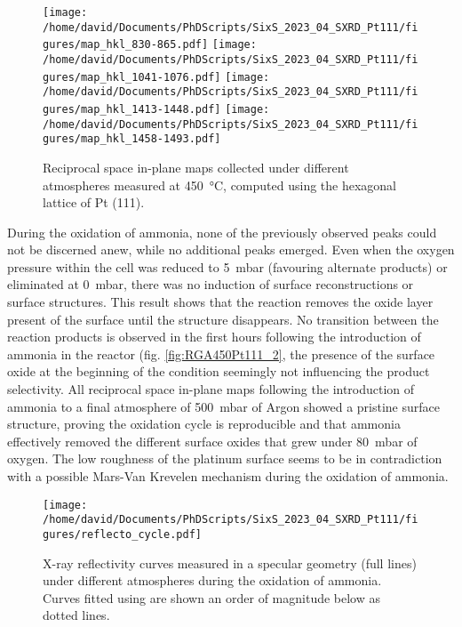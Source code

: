 \begin{figure}[!htb]
    \centering
    \texttt{[image: /home/david/Documents/PhDScripts/SixS\_2023\_04\_SXRD\_Pt111/figures/map\_hkl\_830-865.pdf]}
    \texttt{[image: /home/david/Documents/PhDScripts/SixS\_2023\_04\_SXRD\_Pt111/figures/map\_hkl\_1041-1076.pdf]}
    \texttt{[image: /home/david/Documents/PhDScripts/SixS\_2023\_04\_SXRD\_Pt111/figures/map\_hkl\_1413-1448.pdf]}
    \texttt{[image: /home/david/Documents/PhDScripts/SixS\_2023\_04\_SXRD\_Pt111/figures/map\_hkl\_1458-1493.pdf]}
    \caption{
        Reciprocal space in-plane maps collected under different atmospheres measured at \qty{450}{\degreeCelsius}, computed using the hexagonal lattice of Pt (111).
    }
    \label{fig:MapsPt111B}
\end{figure}

During the oxidation of ammonia, none of the previously observed peaks could not be discerned anew, while no additional peaks emerged.
Even when the oxygen pressure within the cell was reduced to \qty{5}{\milli\bar} (favouring alternate products) or eliminated at \qty{0}{\milli\bar}, there was no induction of surface reconstructions or surface structures.
This result shows that the reaction removes the oxide layer present of the surface until the structure disappears.
No transition between the reaction products is observed in the first hours following the introduction of ammonia in the reactor (fig. \ref{fig:RGA450Pt111_2}, the presence of the surface oxide at the beginning of the condition seemingly not influencing the product selectivity.
All reciprocal space in-plane maps following the introduction of ammonia to a final atmosphere of \qty{500}{\milli\bar} of Argon showed a pristine surface structure, proving the oxidation cycle is reproducible and that ammonia effectively removed the different surface oxides that grew under \qty{80}{\milli\bar} of oxygen.
The low roughness of the platinum surface seems to be in contradiction with a possible Mars-Van Krevelen mechanism during the oxidation of ammonia.

\begin{figure}[!htb]
    \centering
    \texttt{[image: /home/david/Documents/PhDScripts/SixS\_2023\_04\_SXRD\_Pt111/figures/reflecto\_cycle.pdf]}
    \caption{
    	X-ray reflectivity curves measured in a specular geometry (full lines) under different atmospheres during the oxidation of ammonia.
    	Curves fitted using  are shown an order of magnitude below as dotted lines.
    }
    \label{fig:ReflectoCycle}
\end{figure}

